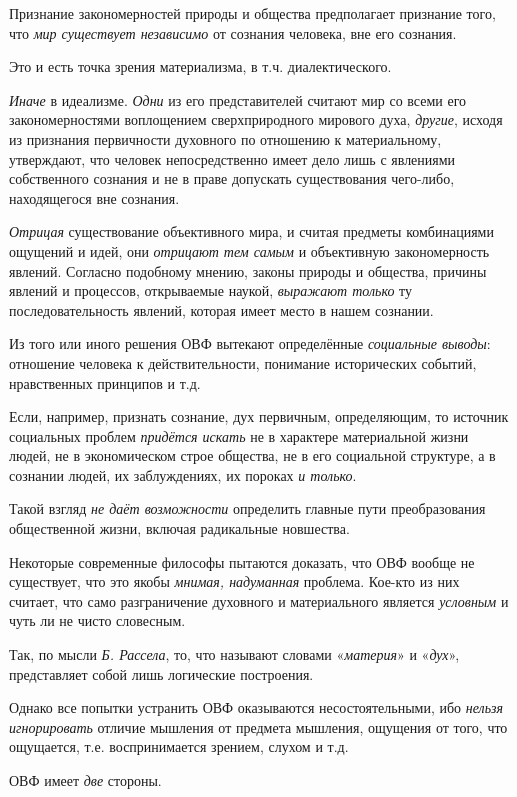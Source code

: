 \documentclass[a4paper,14pt,russian]{extreport}
\begin{document}
Признание закономерностей природы и общества предполагает признание того, что \emph{мир существует независимо} от сознания человека, вне его сознания.

Это и есть точка зрения материализма, в т.ч. диалектического.

\emph{Иначе} в идеализме. \emph{Одни} из его представителей считают мир со всеми его закономерностями воплощением сверхприродного мирового духа, \emph{другие}, исходя из признания первичности духовного по отношению к материальному, утверждают, что человек непосредственно имеет дело лишь с явлениями собственного сознания и не в праве допускать существования чего-либо, находящегося вне сознания.

\emph{Отрицая} существование объективного мира, и считая предметы комбинациями ощущений и идей, они \emph{отрицают тем самым} и объективную закономерность явлений. Согласно подобному мнению, законы природы и общества, причины явлений и процессов, открываемые наукой, \emph{выражают только} ту последовательность явлений, которая имеет место в нашем сознании.

Из того или иного решения ОВФ вытекают определённые \emph{социальные выводы}: отношение человека к действительности, понимание исторических событий, нравственных принципов и т.д.

Если, например, признать сознание, дух первичным, определяющим, то источник социальных проблем \emph{придётся искать} не в характере материальной жизни людей, не в экономическом строе общества, не в его социальной структуре, а в сознании людей, их заблуждениях, их пороках \emph{и только}.

Такой взгляд \emph{не даёт возможности} определить главные пути преобразования общественной жизни, включая радикальные новшества.

Некоторые современные философы пытаются доказать, что ОВФ вообще не существует, что это якобы \emph{мнимая, надуманная} проблема. Кое-кто из них считает, что само разграничение духовного и материального является \emph{условным} и чуть ли не чисто словесным.

Так, по мысли \emph{Б. Рассела}, то, что называют словами «\emph{материя}» и «\emph{дух}», представляет собой лишь логические построения.

Однако все попытки устранить ОВФ оказываются несостоятельными, ибо \emph{нельзя игнорировать} отличие мышления от предмета мышления, ощущения от того, что ощущается, т.е. воспринимается зрением, слухом и т.д.

ОВФ имеет \emph{две} стороны.
\end{document}
